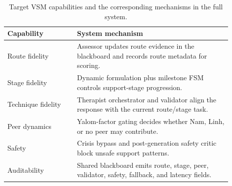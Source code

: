 \begin{table}[t]
\centering
\footnotesize
\setlength{\tabcolsep}{3pt}
\begin{tabular}{p{0.28\linewidth}p{0.62\linewidth}}
\toprule
Capability & System mechanism \\
\midrule
Route fidelity & Assessor updates route evidence in the blackboard and records route metadata for scoring. \\
Stage fidelity & Dynamic formulation plus milestone FSM controls support-stage progression. \\
Technique fidelity & Therapist orchestrator and validator align the response with the current route/stage task. \\
Peer dynamics & Yalom-factor gating decides whether Nam, Linh, or no peer may contribute. \\
Safety & Crisis bypass and post-generation safety critic block unsafe support patterns. \\
Auditability & Shared blackboard emits route, stage, peer, validator, safety, fallback, and latency fields. \\
\bottomrule
\end{tabular}
\caption{Target VSM capabilities and the corresponding mechanisms in the full system.}
\label{tab:vsm_capabilities}
\end{table}
